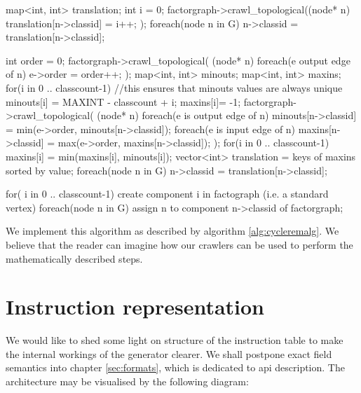 \mybeginfigloose
\begin{code}
map<int, int> translation;
int i = 0;
factorgraph->crawl_topological((node* n){
  translation[n->classid] = i++;
});
foreach(node n in G)
  n->classid = translation[n->classid];
\end{code}

\mybeginfigloose
\begin{code}
int order = 0;
factorgraph->crawl_topological(
  (node* n){ 
    foreach(e output edge of n) 
      e->order = order++;
  }
);
map<int, int> minouts;
map<int, int> maxins;
for(i in 0 .. classcount-1) 
{
  //this ensures that minouts values are always unique
  minouts[i] = MAXINT - classcount + i;
  maxins[i]= -1;
} 
factorgraph->crawl_topological(
  (node* n){
    foreach(e is output edge of n)
      minouts[n->classid] = min(e->order, minouts[n->classid]);
    foreach(e is input edge of n)
      maxins[n->classid] = max(e->order, maxins[n->classid]);
  }
); 
for(i in 0 .. classcount-1)
  maxins[i] = min(maxins[i], minouts[i]);
vector<int> translation = keys of maxins sorted by value;
foreach(node n in G)
  n->classid = translation[n->classid];
\end{code}

\mybeginfigloose
\begin{code}
for( i in 0 .. classcount-1)
  create component i in factograph (i.e. a standard vertex)
foreach(node n in G)
  assign n to component n->classid of factorgraph;
\end{code}

\FloatBarrier


We implement this algorithm as described by algorithm \ref{alg:cycleremalg}. We believe that the reader can imagine how our crawlers can be used to perform the mathematically described steps.

\section{Instruction representation}

\label{sec:instab}

We would like to shed some light on structure of the instruction table to make the internal workings of the generator clearer. We shall postpone exact field semantics into chapter \ref{sec:formats}, which is dedicated to api description. The architecture may be visualised by the following diagram:

